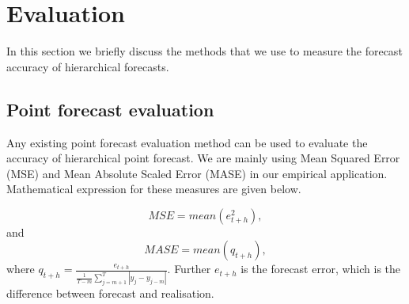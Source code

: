 \documentclass[graybox]{svmult}
\begin{document}


\section{Evaluation}

In this section we briefly discuss the methods that we use to measure the forecast accuracy of hierarchical forecasts.

\subsection{Point forecast evaluation}

Any existing point forecast evaluation method can be used to evaluate the accuracy of hierarchical point forecast. We are mainly using Mean Squared Error (MSE) and Mean Absolute Scaled Error (MASE) in our empirical application. Mathematical expression for these measures are given below.

\begin{equation}\label{eq:22}
MSE = mean(e^2_{t+h}),
\end{equation}
and
\begin{equation}\label{eq:23}
 MASE = mean(q_{t+h}),
\end{equation}
where $q_{t+h} = \frac{e_{t+h}}{\frac{1}{T-m}\sum_{j=m+1}^{T}|y_j - y_{j-m}|}$. Further $e_{t+h}$ is the forecast error, which is the difference between forecast and realisation.
\end{document}
